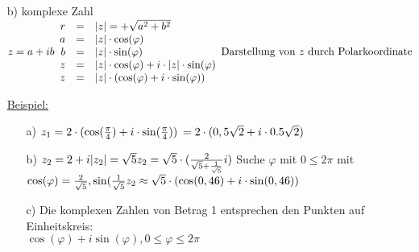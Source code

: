 \begin{enumerate}
\begin{figure}[h!]
\end{figure}
\\
Umfang:$2\pi$\\
$\varphi$ in Grad $\hat{=} \frac{2\pi \cd \varphi}{360}$ im Bogenma\ss\\
F\"ur Punkte mit kartesischen Koordinaten $\neq$ (0,0) werden als Polarkoordinate $(r,\varphi)$ verwendet.
\item[b)]komplexe Zahl $z = a +ib\\
\begin{array}{rcl}
r &=& \lvert z \rvert = + \sqrt{a^2+b^2}\\
a &=& \lvert z \rvert \cdot \cos(\varphi)\\
b &=& \lvert z \rvert \cdot \sin(\varphi)\\
z &=& \lvert z \rvert \cdot \cos(\varphi) + i \cdot \lvert z \rvert \cdot \sin(\varphi)\\
z &=& \lvert z \rvert \cdot ( \cos(\varphi) + i \cdot \sin(\varphi))\\
\end{array}\\
\text{Darstellung von $z$ durch Polarkoordinate}$
\item[\underline{Beispiel:}]\begin{enumerate}
\item[a)]$z_1 = 2 \cdot (\cos(\frac{\pi}{4})+i \cdot \sin(\frac{\pi}{4}))\\
\hspace*{2pt}= 2 \cdot (0,5\sqrt{2}+i \cdot 0.5\sqrt{2})$
\item[b)]$z_2 = 2+i\\
\lvert z_2 \rvert = \sqrt{5}\\
z_2 = \sqrt{5} \cdot (\frac{2}{\sqrt{5} + \frac{1}{\sqrt{5}}}i)$
Suche $\varphi$ mit $0 \leq 2\pi$ mit $\cos(\varphi) =\frac{2}{\sqrt{5}}, \sin(\frac{1}{\sqrt{5}} z_2 \approx \sqrt{5} \cdot (\cos(0,46) + i \cdot \sin(0,46))$
\item[c)] Die komplexen Zahlen von Betrag 1 entsprechen den Punkten auf Einheitskreis: \\$\cos(\varphi) + i \sin(\varphi), 0  \leq \varphi \leq 2\pi$
\end{enumerate}
\end{enumerate}

